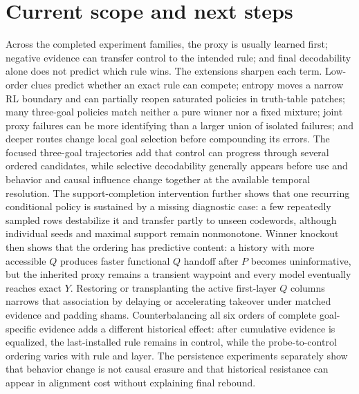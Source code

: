 \documentclass[11pt,a4paper]{article}
\begin{document}
\section*{Current scope and next steps}

Across the completed experiment families, the proxy is usually learned first; negative evidence can transfer control to the intended rule; and final decodability alone does not predict which rule wins. The extensions sharpen each term. Low-order clues predict whether an exact rule can compete; entropy moves a narrow RL boundary and can partially reopen saturated policies in truth-table patches; many three-goal policies match neither a pure winner nor a fixed mixture; joint proxy failures can be more identifying than a larger union of isolated failures; and deeper routes change local goal selection before compounding its errors. The focused three-goal trajectories add that control can progress through several ordered candidates, while selective decodability generally appears before use and behavior and causal influence change together at the available temporal resolution. The support-completion intervention further shows that one recurring conditional policy is sustained by a missing diagnostic case: a few repeatedly sampled rows destabilize it and transfer partly to unseen codewords, although individual seeds and maximal support remain nonmonotone. Winner knockout then shows that the ordering has predictive content: a history with more accessible $Q$ produces faster functional $Q$ handoff after $P$ becomes uninformative, but the inherited proxy remains a transient waypoint and every model eventually reaches exact $Y$. Restoring or transplanting the active first-layer $Q$ columns narrows that association by delaying or accelerating takeover under matched evidence and padding shams. Counterbalancing all six orders of complete goal-specific evidence adds a different historical effect: after cumulative evidence is equalized, the last-installed rule remains in control, while the probe-to-control ordering varies with rule and layer. The persistence experiments separately show that behavior change is not causal erasure and that historical resistance can appear in alignment cost without explaining final rebound.
\end{document}

